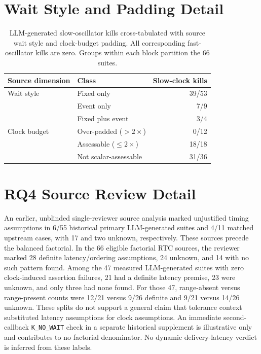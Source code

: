 \section{Wait Style and Padding Detail}\label{app:style}
\begin{table}[t]
\caption{LLM-generated slow-oscillator kills cross-tabulated with source wait style and clock-budget padding. All corresponding fast-oscillator kills are zero. Groups within each block partition the 66 suites.}
\label{tab:style}
\small
\begin{tabular}{@{}llr@{}}
\toprule
Source dimension & Class & Slow-clock kills \\
\midrule
Wait style & Fixed only & 39/53 \\
 & Event only & 7/9 \\
 & Fixed plus event & 3/4 \\
\midrule
Clock budget & Over-padded ($>2\times$) & 0/12 \\
 & Assessable ($\leq2\times$) & 18/18 \\
 & Not scalar-assessable & 31/36 \\
\bottomrule
\end{tabular}
\end{table}
\section{RQ4 Source Review Detail}\label{app:source}
An earlier, unblinded single-reviewer source analysis marked unjustified timing assumptions in 6/55 historical primary LLM-generated suites and 4/11 matched upstream cases, with 17 and two unknown, respectively. These sources precede the balanced factorial. In the 66 eligible factorial RTC sources, the reviewer marked 28 definite latency/ordering assumptions, 24 unknown, and 14 with no such pattern found. Among the 47 measured LLM-generated suites with zero clock-induced assertion failures, 21 had a definite latency premise, 23 were unknown, and only three had none found. For those 47, range-absent versus range-present counts were 12/21 versus 9/26 definite and 9/21 versus 14/26 unknown. These splits do not support a general claim that tolerance context substituted latency assumptions for clock assumptions. An immediate second-callback \texttt{K\_NO\_WAIT} check in a separate historical supplement is illustrative only and contributes to no factorial denominator. No dynamic delivery-latency verdict is inferred from these labels.



